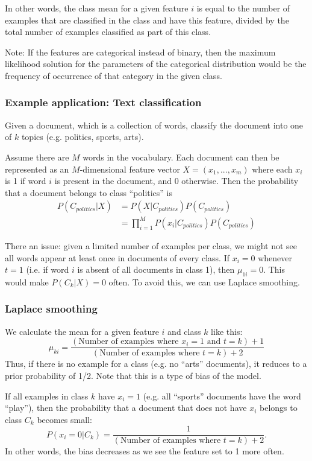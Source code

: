 \documentclass[a4paper,12pt]{article}
\begin{document}
In other words, the class mean for a given feature $i$ is equal to the number of examples that are classified in the class and have this feature, divided by the total number of examples classified as part of this class. 

Note: If the features are categorical instead of binary, then the maximum likelihood solution for the parameters of the categorical distribution would be the frequency of occurrence of that category in the given class. 

\subsubsection{Example application: Text classification}

Given a document, which is a collection of words, classify the document into one of $k$ topics (e.g. politics, sports, arts). 

Assume there are $M$ words in the vocabulary. Each document can then be represented as an $M$-dimensional feature vector $X = (x_1, ..., x_m)$ where each $x_i$ is 1 if word $i$ is present in the document, and 0 otherwise. Then the probability that a document belongs to class ``politics'' is 
\begin{align*}
P(C_{politics}|X) &= P(X|C_{politics})P(C_{politics}) \\
				  &= \prod_{i=1}^M P(x_i|C_{politics})P(C_{politics})
\end{align*}

There an issue: given a limited number of examples per class, we might not see all words appear at least once in documents of every class. If $x_i = 0$ whenever $t=1$ (i.e. if word $i$ is absent of all documents in class 1), then $\mu_{1i} = 0$. This would make $P(C_k|X) = 0$ often. To avoid this, we can use Laplace smoothing. 

\subsubsection{Laplace smoothing}

We calculate the mean for a given feature $i$ and class $k$ like this: 
$$\mu_{ki} = \frac{(\text{Number of examples where } x_i=1 \text{ and } t=k) + 1}{(\text{Number of examples where } t=k) + 2}$$
Thus, if there is no example for a class (e.g. no ``arts'' documents), it reduces to a prior probability of 1/2. Note that this is a type of bias of the model. 

If all examples in class $k$ have $x_i = 1$ (e.g. all ``sports'' documents have the word ``play''), then the probability that a document that does not have $x_i$ belongs to class $C_k$ becomes small: 
$$P(x_i=0|C_k) = \frac{1}{(\text{Number of examples where } t=k) + 2}.$$
In other words, the bias decreases as we see the feature set to 1 more often. 
\end{document}
